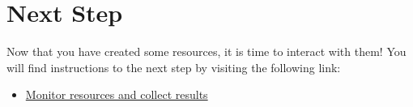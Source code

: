 \section{Next Step}\label{next-step}

Now that you have created some resources, it is time to interact with
them! You will find instructions to the next step by visiting the
following link:

\begin{itemize}
\tightlist
\item
  \href{https://www.chameleoncloud.org/monitor-and-collect/}{Monitor
  resources and collect results}
\end{itemize}

